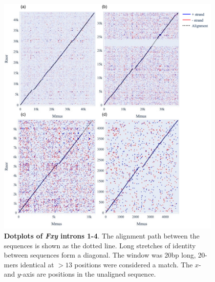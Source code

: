 \begin{figure}[htbp]
\centering
\includegraphics[width=\textwidth]{figures/diagrams/fxy_dotplot_1.pdf}
\caption[Dotplots of \textit{Fxy} introns 1-4]{ \textbf{Dotplots of \textit{Fxy} introns 1-4}. The alignment path between the sequences is shown as the dotted line. Long stretches of identity between sequences form a diagonal. The window was 20bp long, 20-mers identical at $>13$ positions were considered a match. The $x$- and $y$-axis are positions in the unaligned sequence.}
\label{fig:Fxy-dp-1}
\end{figure}